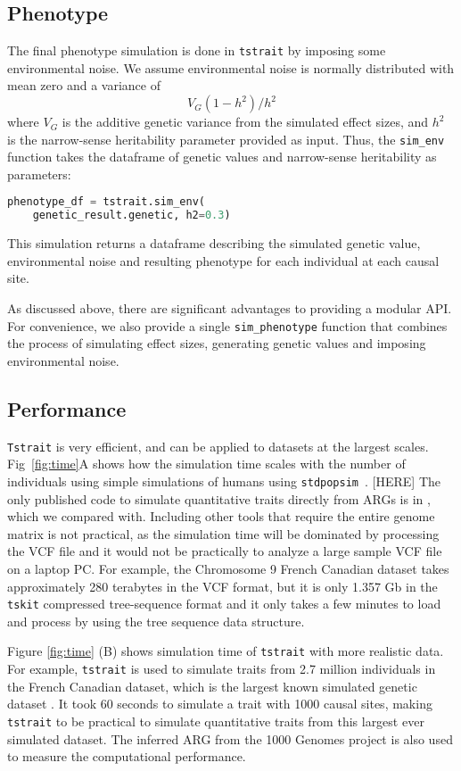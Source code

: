 \documentclass[unnumsec,webpdf,modern,large,namedate]{oup-authoring-template}%
\begin{document}
\subsection{Phenotype}
The final phenotype simulation is done in \texttt{tstrait}
by imposing some environmental noise.
We assume environmental noise is normally distributed with mean zero
and a variance of
\[
V_G(1-h^2)/{h^2}
\]
where $V_G$ is the additive genetic variance from the simulated effect sizes,
and $h^2$ is the narrow-sense heritability parameter provided as input.
Thus, the \texttt{sim\_env} function takes the dataframe of genetic values
and narrow-sense heritability as parameters:
\begin{lstlisting}[language=Python]
phenotype_df = tstrait.sim_env(
    genetic_result.genetic, h2=0.3)
\end{lstlisting}
This simulation returns a dataframe
describing the simulated genetic value, environmental noise and
resulting phenotype for each individual at each causal site.

As discussed above, there are significant advantages to providing a modular
API. For convenience, we also provide a single
\texttt{sim\_phenotype} function that combines the process of simulating
effect sizes, generating genetic values and imposing environmental noise.

\subsection{Performance}
\texttt{Tstrait} is very efficient, and can be applied to datasets at the
largest scales.
Fig~\ref{fig:time}A shows how the simulation time scales
with the number of individuals using simple simulations
of humans using \texttt{stdpopsim}~\citep{adrion2020}.
[HERE]
The only published code to simulate quantitative traits
directly from ARGs is in \cite{martin2017}, which we compared with. Including
other tools that require the entire genome matrix is not practical, as the
simulation time will be dominated by processing the VCF file and it would not
be practically to analyze a large sample VCF file on a laptop PC. For example,
the Chromosome 9 French Canadian dataset takes approximately 280 terabytes in
the VCF format, but it is only 1.357 Gb in the \texttt{tskit} compressed
tree-sequence format and it only takes a few minutes to load and process by
using the tree sequence data structure.

Figure \ref{fig:time} (B) shows simulation time of \texttt{tstrait} with more
realistic data. For example, \texttt{tstrait} is used to simulate traits from
2.7 million individuals in the French Canadian dataset, which is the largest
known simulated genetic dataset \citep{anderson2023}. It took 60 seconds to
simulate a trait with 1000 causal sites, making \texttt{tstrait} to be
practical to simulate quantitative traits from this largest ever simulated
dataset. The inferred ARG from the 1000 Genomes project \citep{kelleher2019} is
also used to measure the computational performance.
\end{document}
